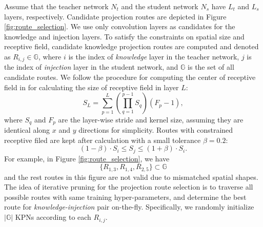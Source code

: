 \documentclass[journal]{IEEEtran}
\begin{document}
Assume that the teacher network $N_t$ and the student network $N_s$ have $L_t$ and $L_s$ layers, respectively. Candidate projection routes are depicted in Figure \ref{fig:route_selection}. We use only convolution layers as candidates for the knowledge and  injection layers. To satisfy the constraints on spatial size and receptive field, candidate knowledge projection routes are computed and denoted as $R_{i, j} \in \mathbb{G} $, where $i$ is the index of \textit{knowledge} layer in the teacher network, $j$ is the index of \textit{injection} layer in the student network, and $\mathbb{G}$ is the set of all candidate routes. We follow the procedure for computing the center of receptive field in \cite{lenc2015r} for calculating the size of receptive field in layer $L$:
\begin{equation}
\label{eq:receptive_field}
    S_L = \sum_{p=1}^{L}{(\prod_{q=1}^{p-1}{S_q}) (F_p - 1)},
\end{equation}
where $S_q$ and $F_p$ are the layer-wise stride and kernel size, assuming they are identical along $x$ and $y$ directions for simplicity. Routes with constrained receptive filed are kept after calculation with a small tolerance $\beta=0.2$:
\begin{equation}
\label{eq:tolerance}
    (1-\beta) \cdot S_i \le S_j \le (1+\beta) \cdot S_i.
\end{equation}
For example, in Figure \ref{fig:route_selection}, we have 
\begin{equation}
\{R_{1, 3}, R_{1, 4}, R_{2,5}\} \subset \mathbb{G}
\end{equation}
 and the rest routes in this figure are not valid due to mismatched spatial shapes. The idea of iterative pruning for the projection route selection is to traverse all possible routes with same training hyper-parameters, and determine the best route for \textit{knowledge-injection} pair on-the-fly. Specifically, we randomly initialize $|\mathbb{G}|$ KPNs according to each $R_{i, j}$. 
 
\end{document}
